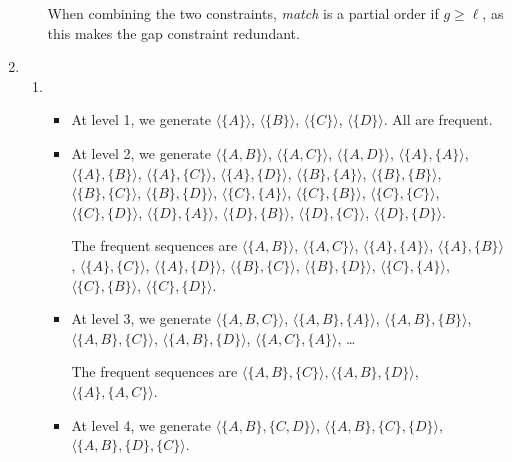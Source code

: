 \documentclass[pdf]{article}
\newcommand{\seq}[1]{\langle #1 \rangle}
\begin{document}
\begin{enumerate}
\begin{enumerate}
		When combining the two constraints, \textit{match} is a partial order if \(g \ge \ell\), as this makes the gap constraint redundant.
	\end{enumerate}
	\item \begin{enumerate}
		\item \begin{itemize}
			\item At level 1, we generate \(\seq{\{A\}}\), \(\seq{\{B\}}\), \(\seq{\{C\}}\), \(\seq{\{D\}}\).
			All are frequent.
			\item At level 2, we generate \(\seq{\{A, B\}}\), \(\seq{\{A, C\}}\), \(\seq{\{A, D\}}\), \(\seq{\{A\}, \{A\}}\), \(\seq{\{A\}, \{B\}}\), \(\seq{\{A\}, \{C\}}\), \(\seq{\{A\}, \{D\}}\), \(\seq{\{B\}, \{A\}}\), \(\seq{\{B\}, \{B\}}\), \(\seq{\{B\}, \{C\}}\), \(\seq{\{B\}, \{D\}}\), \(\seq{\{C\}, \{A\}}\),  \(\seq{\{C\}, \{B\}}\), \(\seq{\{C\}, \{C\}}\), \(\seq{\{C\}, \{D\}}\), \(\seq{\{D\}, \{A\}}\), \(\seq{\{D\}, \{B\}}\), \(\seq{\{D\}, \{C\}}\), \(\seq{\{D\}, \{D\}}\).
			
			The frequent sequences are \(\seq{\{A, B\}}\), \(\seq{\{A, C\}}\), \(\seq{\{A\}, \{A\}}\), \(\seq{\{A\}, \{B\}}\), \(\seq{\{A\}, \{C\}}\), \(\seq{\{A\}, \{D\}}\), \(\seq{\{B\}, \{C\}}\), \(\seq{\{B\}, \{D\}}\), \(\seq{\{C\}, \{A\}}\), \(\seq{\{C\}, \{B\}}\), \(\seq{\{C\}, \{D\}}\).
			\item At level 3, we generate \(\seq{\{A, B, C\}}\), \(\seq{\{A, B\}, \{A\}}\), \(\seq{\{A, B\}, \{B\}}\), \(\seq{\{A, B\}, \{C\}}\), \(\seq{\{A, B\}, \{D\}}\), \(\seq{\{A, C\}, \{A\}}\), \dots
			
			The frequent sequences are \(\seq{\{A, B\}, \{C\}}, \seq{\{A, B\},\{D\}}\), \(\seq{\{A\}, \{A, C\}}\).
			\item At level 4, we generate \(\seq{\{A, B\}, \{C, D\}}\), \(\seq{\{A, B\}, \{C\}, \{D\}}\), \(\seq{\{A, B\}, \{D\}, \{C\}}\).
			

\end{itemize}
\end{enumerate}
\end{enumerate}
\end{document}
